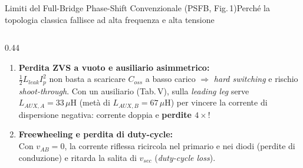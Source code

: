 \documentclass[aspectratio=169,9pt]{beamer}
\newcommand{\uH}{\,\mu\text{H}}
\begin{document}
\begin{frame}{Limiti del Full-Bridge Phase-Shift Convenzionale (PSFB, Fig.\,1)}{Perch\'e la topologia classica fallisce ad alta frequenza e alta tensione}
\begin{columns}[T,onlytextwidth]
\begin{column}{0.44\textwidth}
\begin{enumerate}
        \item \textbf{\color{AlertRed}Perdita ZVS a vuoto e ausiliario asimmetrico:}\\
              $\frac{1}{2}L_{leak}I_p^2$ non basta a scaricare $C_{oss}$ a basso carico $\Rightarrow$ \emph{hard switching} e rischio \emph{shoot-through}. Con un ausiliario (Tab.\,V), sulla \emph{leading leg} serve $L_{AUX,A}=33\uH$ (met\`a di $L_{AUX,B}=67\uH$) per vincere la corrente di dispersione negativa: corrente doppia e \textbf{perdite $4\times$}!
        \item \textbf{\color{AlertRed}Freewheeling e perdita di duty-cycle:}\\
              Con $v_{AB}=0$, la corrente riflessa ricircola nel primario e nei diodi (perdite di conduzione) e ritarda la salita di $v_{sec}$ (\emph{duty-cycle loss}).
      \end{enumerate}
    \end{column}
  \end{columns}
\end{frame}
\end{document}
